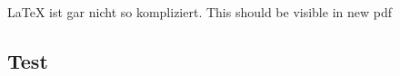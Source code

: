 \documentclass{article}
\begin{document}
	\LaTeX{} ist gar nicht so kompliziert.
	This should be visible in new pdf
	\subsection{Test}
\end{document}
